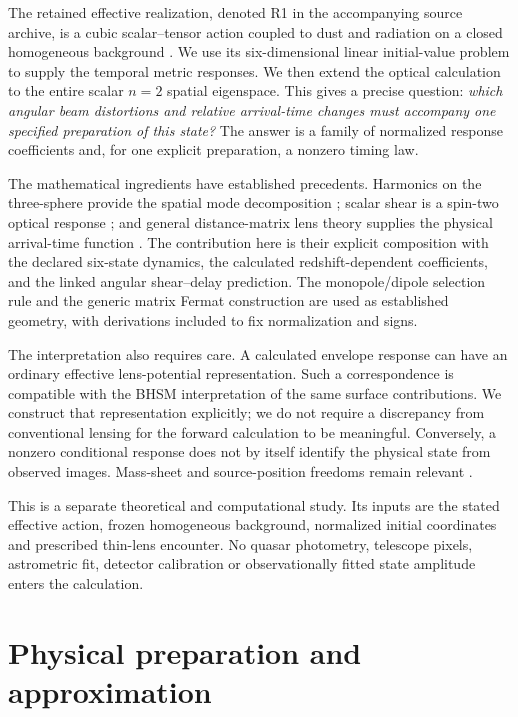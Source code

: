 \documentclass[11pt,a4paper]{article}
\begin{document}
The retained effective realization, denoted R1 in the accompanying source
archive, is a cubic scalar--tensor action coupled to dust and radiation
on a closed homogeneous background
\cite{Carberry2026EnvironmentalSource,Carberry2026TransportSource}.
We use its six-dimensional linear initial-value problem to supply the
temporal metric responses. We then extend the optical calculation to the
entire scalar $n=2$ spatial eigenspace. This gives a precise question:
\emph{which angular beam distortions and relative arrival-time changes
must accompany one specified preparation of this state?}
The answer is a family of normalized response coefficients and, for one
explicit preparation, a nonzero timing law.

The mathematical ingredients have established precedents. Harmonics on
the three-sphere provide the spatial mode decomposition
\cite{Lindblom2017Harmonics}; scalar shear is a spin-two optical response
\cite{Bernardeau2010FullSky}; and general distance-matrix lens theory
supplies the physical arrival-time function
\cite{Fleury2021Arbitrary,Schneider2019Multiplane}. The contribution here
is their explicit composition with the declared six-state dynamics, the
calculated redshift-dependent coefficients, and the linked angular
shear--delay prediction. The monopole/dipole selection rule and the
generic matrix Fermat construction are used as established geometry,
with derivations included to fix normalization and signs.

The interpretation also requires care. A calculated envelope response can
have an ordinary effective lens-potential representation. Such a
correspondence is compatible with the BHSM interpretation of the same
surface contributions. We construct that representation explicitly;
we do not require a discrepancy from conventional lensing for the forward
calculation to be meaningful. Conversely, a nonzero conditional response
does not by itself identify the physical state from observed images.
Mass-sheet and source-position freedoms remain relevant
\cite{Schneider2019Multiplane,SchneiderSluse2014SPT}.

This is a separate theoretical and computational study. Its inputs are
the stated effective action, frozen homogeneous background, normalized
initial coordinates and prescribed thin-lens encounter. No quasar
photometry, telescope pixels, astrometric fit, detector calibration or
observationally fitted state amplitude enters the calculation.

\section{Physical preparation and approximation}
\label{sec:preparation}
\end{document}
